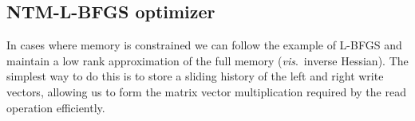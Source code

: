 \documentclass{article}
\begin{document}
\subsection*{NTM-L-BFGS optimizer}

In cases where memory is constrained we can follow the example of
L-BFGS and maintain a low rank approximation of the
full memory (\emph{vis}.\ inverse Hessian).
The simplest way to do this is to store a sliding history of the left and right write vectors,
allowing us to form the matrix vector multiplication required by the read operation efficiently.










\end{document}
